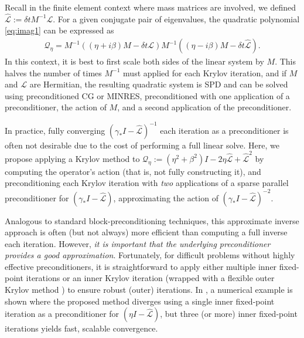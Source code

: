 \documentclass[review]{siamart}
\begin{document}
\begin{remark}
Recall in the finite element context where mass matrices are involved, we defined
$\widehat{\mathcal{L}} := \delta t M^{-1}\mathcal{L}$. For a given conjugate pair
of eigenvalues, the quadratic polynomial \eqref{eq:imag1} can be expressed as
%
\begin{align}\label{eq:scaleM}
\mathcal{Q}_\eta = M^{-1}((\eta + i\beta)M - \delta t{\mathcal{L}})M^{-1}((\eta - i\beta)M -
	\delta t\widehat{\mathcal{L}}).
\end{align}
%
In this context, it is best to first scale both sides of the linear system by $M$.
This halves the number of times $M^{-1}$ must applied for each Krylov iteration,
and if $M$ and $\mathcal{L}$ are Hermitian, the resulting quadratic system is SPD
and can be solved using preconditioned CG or MINRES, preconditioned
with one application of a preconditioner, the action of $M$, and a second application
of the preconditioner.
\end{remark}

\begin{remark}\label{sec:inexact-precond}
In practice, fully converging $(\gamma_* I - \widehat{\mathcal{L}})^{-1}$ 
each iteration as a preconditioner is often not desirable due to the cost
of performing a full linear solve. Here, we propose
applying a Krylov method to $\mathcal{Q}_\eta:=(\eta^2+\beta^2)I - 2\eta\widehat{\mathcal{L}} +
\widehat{\mathcal{L}}^2$ by computing the operator's action (that is, not fully constructing
it), and preconditioning each Krylov iteration with \textit{two} applications of a sparse
parallel preconditioner for $(\gamma_* I - \widehat{\mathcal{L}})$, approximating the action
of $(\gamma_* I - \widehat{\mathcal{L}})^{-2}$.

Analogous to standard block-preconditioning techniques, this approximate inverse
approach is often (but not always) more efficient than computing a full inverse
each iteration. However, \textit{it is important that the underlying preconditioner
provides a good approximation}. 
Fortunately, for difficult problems without highly effective
preconditioners, it is straightforward to apply either multiple inner fixed-point iterations
or an inner Krylov iteration (wrapped with a flexible outer Krylov method
\cite{Notay2000,saad1993flexible}) to ensure robust (outer) iterations.
In , a
numerical example is shown where the proposed method diverges using a single inner
fixed-point iteration as a preconditioner for $(\eta I - \widehat{\mathcal{L}})$, but
three (or more) inner fixed-point iterations yields fast, scalable convergence.
\end{remark}
\end{document}

